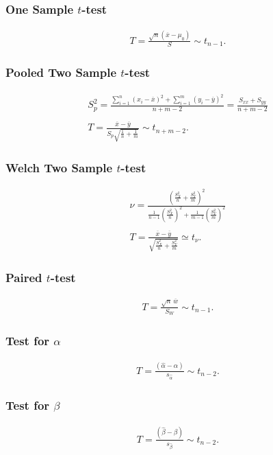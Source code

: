 \documentclass[a4paper, 12pt, twoside]{article}
\begin{document}
\subsubsection{One Sample $t$-test}
\begin{gather*}
    T = \frac{\sqrt{n}(\overline{x} - \mu_0)}{S} \sim t_{n-1}.
\end{gather*}

\subsubsection{Pooled Two Sample $t$-test}
\begin{gather*}
    S_p^2 = \frac{\sum_{i = 1}^n (x_i - \overline{x})^2
        + \sum_{i = 1}^m (y_i - \overline{y})^2}{n + m - 2}
    = \frac{S_{xx} + S_{yy}}{n + m - 2} \\ \\
    T = \frac{\overline{x} - \overline{y}}
    {S_p\sqrt{\frac{1}{n} + \frac{1}{m}}} \sim t_{n + m - 2}.
\end{gather*}

\subsubsection{Welch Two Sample $t$-test}
\begin{gather*}
    \nu = \frac{(\frac{S_X^2}{n} + \frac{S_Y^2}{m})^2}
    {\frac{1}{n - 1}(\frac{S_X^2}{n})^2
        + \frac{1}{m - 1}(\frac{S_Y^2}{m})^2} \\ \\
    T = \frac{\overline{x} - \overline{y}}
    {\sqrt{\frac{S_X^2}{n} + \frac{S_Y^2}{m}}} \simeq t_\nu.
\end{gather*}

\subsubsection{Paired $t$-test}
\begin{gather*}
    T = \frac{\sqrt{n} \, \overline{w}}{S_W} \sim t_{n - 1}.
\end{gather*}

\subsubsection{Test for $\alpha$}
\begin{gather*}
    T = \frac{(\hat\alpha - \alpha)}{s_{\hat\alpha}}
    \sim t_{n - 2}.
\end{gather*}

\subsubsection{Test for $\beta$}
\begin{gather*}
    T = \frac{(\hat\beta - \beta)}{s_{\hat\beta}}
    \sim t_{n - 2}.
\end{gather*}
\end{document}
